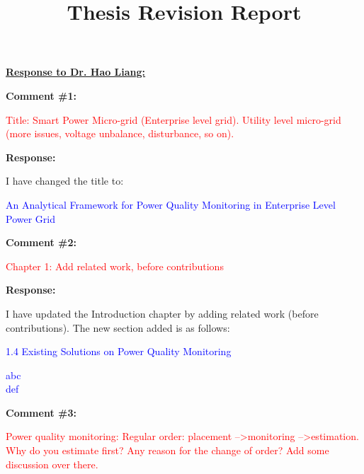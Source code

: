 \documentclass[journal]{IEEEtran}
\begin{document}
\title{Thesis Revision Report}
\maketitle

 \Large
\noindent \textbf{\underline{Response to Dr. Hao Liang:}}
 \large

\vspace{10pt}
\textbf{Comment \#1:}
\begin{adjustwidth}{2.5em}{0pt}
\singlespacing \vspace{-10pt}
\textcolor{red}{Title: Smart Power Micro-grid (Enterprise level grid). Utility level micro-grid (more issues, voltage unbalance, disturbance, so on).}
\end{adjustwidth}

\vspace{5pt}
\textbf{Response:}
\begin{adjustwidth}{2.5em}{0pt}
I have changed the title to:

\vspace{5pt}
\noindent\textcolor{blue}{An Analytical Framework for Power Quality Monitoring in Enterprise Level Power Grid}
\end{adjustwidth}
 
 
 
\vspace{30pt}
\textbf{Comment \#2:}
\begin{adjustwidth}{2.5em}{0pt}
\singlespacing \vspace{-10pt}
\textcolor{red}{Chapter 1: Add related work, before contributions}
\end{adjustwidth}

\vspace{5pt}
\textbf{Response:}
\begin{adjustwidth}{2.5em}{0pt}
I have updated the Introduction chapter by adding related work (before contributions). The new section added is as follows:

\vspace{5pt}
\noindent\textcolor{blue}{{\large 1.4 Existing Solutions on Power Quality Monitoring}
\begin{adjustwidth}{2.5em}{0pt}
abc \\ def
\end{adjustwidth}}
\end{adjustwidth}



\vspace{30pt}
\textbf{Comment \#3:}
\begin{adjustwidth}{2.5em}{0pt}
\singlespacing \vspace{-10pt}
\textcolor{red}{Power quality monitoring: Regular order: placement --\textgreater monitoring --\textgreater estimation. Why do you estimate first? Any reason for the change of order? Add some discussion over there.}
\end{adjustwidth}
\end{document}
